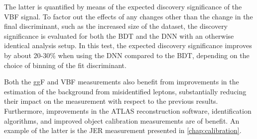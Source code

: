 The latter is quantified by means of the expected discovery significance of the VBF signal.
To factor out the effects of any changes other than the change in the final discriminant, such as the increased size of the dataset, the discovery significance is evaluated for both the BDT and the DNN with an otherwise identical analysis setup. In this test, the expected discovery significance improves by about 20-30\% when using the DNN compared to the BDT, depending on the choice of binning of the fit discriminant. 

Both the ggF and VBF measurements also benefit from improvements in the estimation of the background from misidentified leptons, substantially reducing their impact on the measurement with respect to the previous results. 
Furthermore, improvements in the ATLAS reconstruction software, identification algorithms, and improved object calibration measurements are of benefit. 
An example of the latter is the JER measurement presented in \cref{chap:calibration}. 

